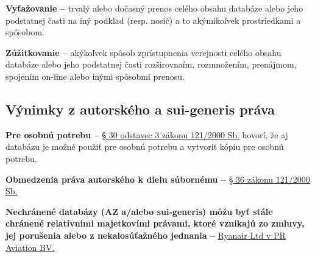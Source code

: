 \textbf{Vyťažovanie \--- } trvalý alebo dočasný prenos celého obsahu databáze alebo jeho podstatnej časti na iný podklad (resp. nosič) a to akýmikoľvek prostriedkami a spôsobom.

\textbf{Zúžitkovanie \--- } akýkoľvek spôsob zprístupnenia verejnosti celého obsahu databáze alebo jeho podstatnej časti rozširovnaím, rozmnožením, prenájmom, spojením on-line alebo inými spôsobmi prenosu.

\subsection{Výnimky z autorského a sui-generis práva}

\textbf{Pre osobnú potrebu \---} \href{https://www.zakonyprolidi.cz/cs/2000-121#:~:text=uziti%20pocitacoveho%20programu%20ci%20elektronicke%20databaze%20i%20pro%20osobni%20potrebu}{§ 30 odstavec 3 zákonu 121/2000 Sb.} hovorí, že aj databázu je možné použiť pre osobnú potrebu a vytvoriť kópiu pre osobnú potrebu.

\textbf{Obmedzenia práva autorského k dielu súbornému \---} \href{https://www.zakonyprolidi.cz/cs/2000-121#:~:text=k%20d%C3%ADlu%20souborn%C3%A9mu%2C-,ktere%20je%20databazi,-%2C%20nezasahuje%20opr%C3%A1vn%C4%9Bn%C3%BD%20u%C5%BEivatel}{§ 36 zákonu 121/2000 Sb.}

\textbf{Nechránené databázy (AZ a/alebo sui-generis) môžu byť stále chránené relatívnimi majetkovími právami, ktoré vznikajú zo zmluvy, jej porušenia alebo z nekalosúťažného jednania \---} \href{https://eur-lex.europa.eu/legal-content/EN/TXT/?uri=CELEX%3A62014CJ0030}{Ryanair Ltd v PR Aviation BV.}

